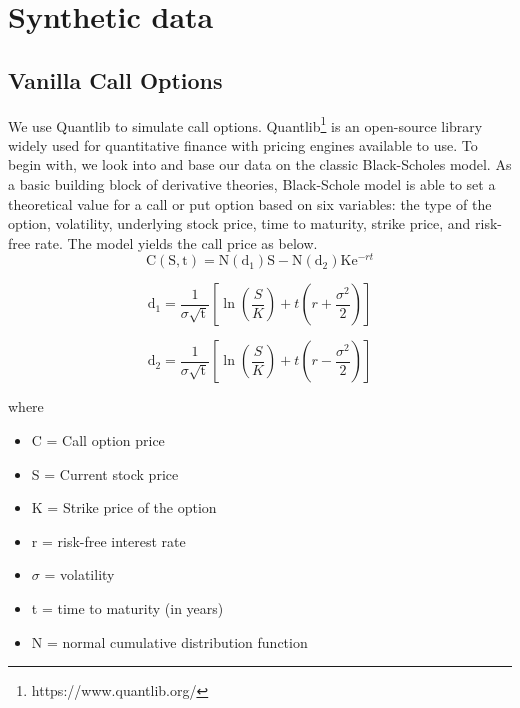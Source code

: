 \documentclass{report}
\begin{document}
\section{Synthetic data}

\subsection{Vanilla Call Options}
We use Quantlib to simulate call options. Quantlib\footnote{https://www.quantlib.org/} is an open-source library widely used for quantitative finance with pricing engines available to use. To begin with, we look into and base our data on the classic Black-Scholes model. As a basic building block of derivative theories, Black-Schole model is able to set a theoretical value for a call or put option based on six variables: the type of the option, volatility, underlying stock price, time to maturity, strike price, and risk-free rate. The model yields the call price as below.\\

\begin{equation}
\mathrm C(\mathrm S,\mathrm t)= \mathrm N(\mathrm d_1)\mathrm S - \mathrm N(\mathrm d_2) \mathrm K \mathrm e^{-rt}
\label{eq:2}
\end{equation}

\begin{equation}
\mathrm d_1= \frac{1}{\sigma \sqrt{\mathrm t}} \left[\ln{\left(\frac{S}{K}\right)} + t\left(r + \frac{\sigma^2}{2} \right) \right]
\end{equation}

\begin{equation}
\mathrm d_2= \frac{1}{\sigma \sqrt{\mathrm t}} \left[\ln{\left(\frac{S}{K}\right)} + t\left(r - \frac{\sigma^2}{2} \right) \right]
\end{equation}

where 
\begin{itemize}
	\item[] C = Call option price 
	\item[] S = Current stock price
	\item[] K = Strike price of the option
	\item[] r = risk-free interest rate 
	\item[] $\sigma$ = volatility 
	\item[] t = time to maturity (in years)
	\item[] N = normal cumulative distribution function
\end{itemize}
\end{document}
